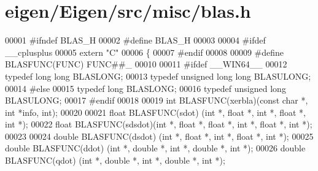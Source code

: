 \hypertarget{eigen_2_eigen_2src_2misc_2blas_8h_source}{}\section{eigen/\+Eigen/src/misc/blas.h}
\label{eigen_2_eigen_2src_2misc_2blas_8h_source}

\begin{DoxyCode}
00001 \textcolor{preprocessor}{#ifndef BLAS\_H}
00002 \textcolor{preprocessor}{#define BLAS\_H}
00003 
00004 \textcolor{preprocessor}{#ifdef \_\_cplusplus}
00005 \textcolor{keyword}{extern} \textcolor{stringliteral}{"C"}
00006 \{
00007 \textcolor{preprocessor}{#endif}
00008 
00009 \textcolor{preprocessor}{#define BLASFUNC(FUNC) FUNC##\_}
00010 
00011 \textcolor{preprocessor}{#ifdef \_\_WIN64\_\_}
00012 \textcolor{keyword}{typedef} \textcolor{keywordtype}{long} \textcolor{keywordtype}{long} BLASLONG;
00013 \textcolor{keyword}{typedef} \textcolor{keywordtype}{unsigned} \textcolor{keywordtype}{long} \textcolor{keywordtype}{long} BLASULONG;
00014 \textcolor{preprocessor}{#else}
00015 \textcolor{keyword}{typedef} \textcolor{keywordtype}{long} BLASLONG;
00016 \textcolor{keyword}{typedef} \textcolor{keywordtype}{unsigned} \textcolor{keywordtype}{long} BLASULONG;
00017 \textcolor{preprocessor}{#endif}
00018 
00019 \textcolor{keywordtype}{int}    BLASFUNC(xerbla)(\textcolor{keyword}{const} \textcolor{keywordtype}{char} *, \textcolor{keywordtype}{int} *info, int);
00020 
00021 \textcolor{keywordtype}{float}  BLASFUNC(sdot)  (\textcolor{keywordtype}{int} *, \textcolor{keywordtype}{float}  *, \textcolor{keywordtype}{int} *, \textcolor{keywordtype}{float}  *, \textcolor{keywordtype}{int} *);
00022 \textcolor{keywordtype}{float}  BLASFUNC(sdsdot)(\textcolor{keywordtype}{int} *, \textcolor{keywordtype}{float}  *,        \textcolor{keywordtype}{float}  *, \textcolor{keywordtype}{int} *, \textcolor{keywordtype}{float}  *, \textcolor{keywordtype}{int} *);
00023 
00024 \textcolor{keywordtype}{double} BLASFUNC(dsdot) (\textcolor{keywordtype}{int} *, \textcolor{keywordtype}{float}  *, \textcolor{keywordtype}{int} *, \textcolor{keywordtype}{float}  *, \textcolor{keywordtype}{int} *);
00025 \textcolor{keywordtype}{double} BLASFUNC(ddot)  (\textcolor{keywordtype}{int} *, \textcolor{keywordtype}{double} *, \textcolor{keywordtype}{int} *, \textcolor{keywordtype}{double} *, \textcolor{keywordtype}{int} *);
00026 \textcolor{keywordtype}{double} BLASFUNC(qdot)  (\textcolor{keywordtype}{int} *, \textcolor{keywordtype}{double} *, \textcolor{keywordtype}{int} *, \textcolor{keywordtype}{double} *, \textcolor{keywordtype}{int} *);

\end{DoxyCode}
